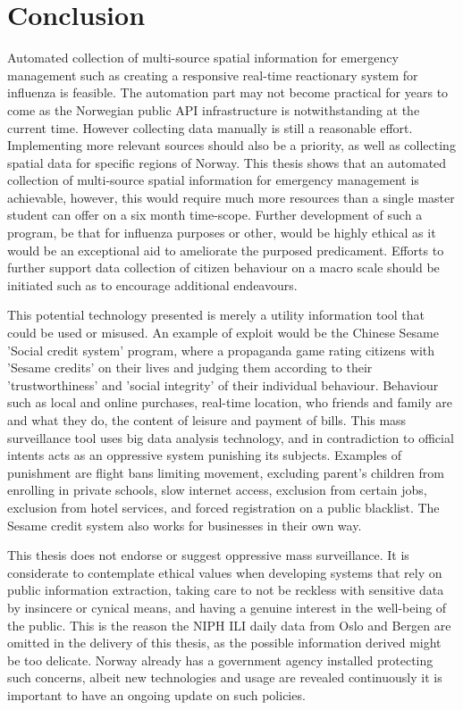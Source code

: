 \section{Conclusion}
Automated collection of multi-source spatial information for emergency management such as creating a responsive real-time reactionary system for influenza is feasible.
The automation part may not become practical for years to come as the Norwegian public API infrastructure is notwithstanding at the current time. However collecting data manually is still a reasonable effort. Implementing more relevant sources should also be a priority, as well as collecting spatial data for specific regions of Norway. 
This thesis shows that an automated collection of multi-source spatial information for emergency management is achievable, however, this would require much more resources than a single master student can offer on a six month time-scope. Further development of such a program, be that for influenza purposes or other, would be highly ethical as it would be an exceptional aid to ameliorate the purposed predicament. Efforts to further support data collection of citizen behaviour on a macro scale should be initiated such as to encourage additional endeavours.

This potential technology presented is merely a utility information tool that could be used or misused. An example of exploit would be the Chinese Sesame 'Social credit system' program\cite{meissner2017china}\cite{china_botsman}\cite{china_wiki}, where a propaganda game rating citizens with 'Sesame credits' on their lives and judging them according to their 'trustworthiness' and 'social integrity' of their individual behaviour. Behaviour such as local and online purchases, real-time location, who friends and family are and what they do, the content of leisure and payment of bills. This mass surveillance tool uses big data analysis technology, and in contradiction to official intents acts as an oppressive system punishing its subjects. Examples of punishment are flight bans limiting movement, excluding parent's children from enrolling in private schools, slow internet access, exclusion from certain jobs, exclusion from hotel services, and forced registration on a public blacklist. The Sesame credit system also works for businesses in their own way.

This thesis does not endorse or suggest oppressive mass surveillance. It is considerate to contemplate ethical values when developing systems that rely on public information extraction, taking care to not be reckless with sensitive data by insincere or cynical means, and having a genuine interest in the well-being of the public. This is the reason the NIPH ILI daily data from Oslo and Bergen are omitted in the delivery of this thesis, as the possible information derived might be too delicate. Norway already has a government agency installed protecting such concerns\cite{datatilsynet}, albeit new technologies and usage are revealed continuously it is important to have an ongoing update on such policies.


